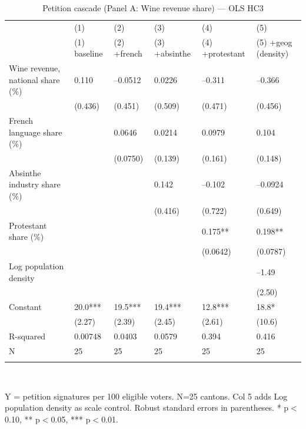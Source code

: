 \begin{table}[tbp] \centering
{}

\caption{Petition cascade (Panel A: Wine revenue share) --- OLS HC3}
\label{tab:T4_X3_OLS}
\begin{tabularx}{\linewidth}{@{}lCCCCC@{}}

\toprule
&{(1)}&{(2)}&{(3)}&{(4)}&{(5)} \tabularnewline
 & (1) baseline & (2) +french & (3) +absinthe & (4) +protestant & (5) +geog (density) \tabularnewline 
\midrule \addlinespace[\belowrulesep]
Wine revenue, national share (\%)&0.110&--0.0512&0.0226&--0.311&--0.366 \tabularnewline
&(0.436)&(0.451)&(0.509)&(0.471)&(0.456) \tabularnewline
French language share (\%)&&0.0646&0.0214&0.0979&0.104 \tabularnewline
&&(0.0750)&(0.139)&(0.161)&(0.148) \tabularnewline
Absinthe industry share (\%)&&&0.142&--0.102&--0.0924 \tabularnewline
&&&(0.416)&(0.722)&(0.649) \tabularnewline
Protestant share (\%)&&&&0.175**&0.198** \tabularnewline
&&&&(0.0642)&(0.0787) \tabularnewline
Log population density&&&&&--1.49 \tabularnewline
&&&&&(2.50) \tabularnewline
Constant&20.0***&19.5***&19.4***&12.8***&18.8* \tabularnewline
&(2.27)&(2.39)&(2.45)&(2.61)&(10.6) \tabularnewline
\midrule R-squared&0.00748&0.0403&0.0579&0.394&0.416 \tabularnewline
N&25&25&25&25&25 \tabularnewline
\bottomrule \addlinespace[\belowrulesep]

\end{tabularx}
\\ \parbox{\linewidth}{\footnotesize Y = petition signatures per 100 eligible voters. N=25 cantons. Col 5 adds Log population density as scale control. Robust standard errors in parentheses. * p\(<\)0.10, ** p\(<\)0.05, *** p\(<\)0.01.}
\end{table}
